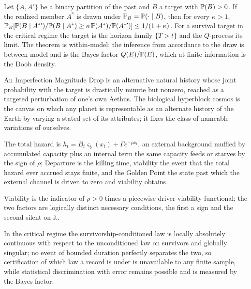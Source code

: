 \begin{theorem}
\label{imp:targeted}
Let $\{A,A'\}$ be a binary partition of the past and $B$ a target with
$\mathbb{P}(B)>0$. If the realized member $A^\ast$ is drawn under
$\mathbb{P}_B=\mathbb{P}(\cdot\mid B)$, then for every $\kappa>1$,
$\mathbb{P}_B[\mathbb{P}(B\mid A^{\ast\prime})/\mathbb{P}(B\mid A^\ast)\ge\kappa\,\mathbb{P}(A^\ast)/\mathbb{P}(A^{\ast\prime})]\le1/(1+\kappa)$.
For a survival target in the critical regime the target is the horizon
family $\{T>t\}$ and the $Q$-process its limit. The theorem is
within-model; the inference from accordance to the draw is between-model
and is the Bayes factor $Q(E)/\mathbb{P}(E)$, which at finite information is the
Doob density.
\end{theorem}

\begin{definition}
\label{imp:imd}
An Imperfection Magnitude Drop is an alternative natural history whose
joint probability with the target is drastically minute but nonzero,
reached as a targeted perturbation of one's own Aethus. The biological
hyperblock cosmos is the canvas on which any planet is representable as
an alternate history of the Earth by varying a stated set of its
attributes; it fixes the class of nameable variations of ourselves.
\end{definition}

\begin{definition}
\label{imp:goldenpoint}
The total hazard is $h_t=B_t\varsigma_b(x_t)+\Gamma e^{-\rho x_t}$, an
external background muffled by accumulated capacity plus an internal term
the same capacity feeds or starves by the sign of $\rho$; Departure is the
killing time, viability the event that the total hazard ever accrued stays
finite, and the Golden Point the state past which the external channel is
driven to zero and viability obtains.
\end{definition}

\begin{theorem}
\label{imp:twocond}
Viability is the indicator of $\rho>0$ times a piecewise driver-viability
functional; the two factors are logically distinct necessary conditions,
the first a sign and the second silent on it.
\end{theorem}

\begin{theorem}
\label{imp:ceiling}
In the critical regime the survivorship-conditioned law is locally
absolutely continuous with respect to the unconditioned law on survivors
and globally singular; no event of bounded duration perfectly separates
the two, so certification of which law a record is under is unavailable
to any finite sample, while statistical discrimination with error remains
possible and is measured by the Bayes factor.
\end{theorem}

